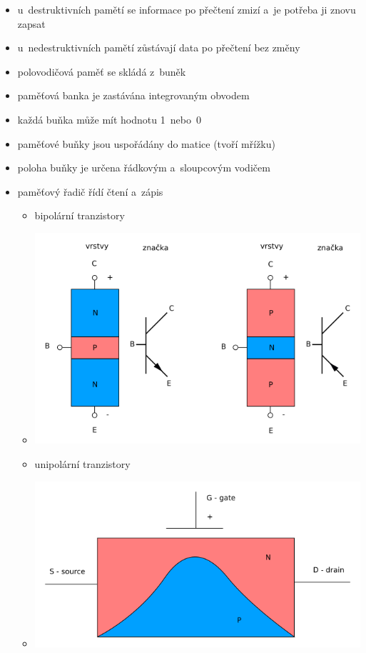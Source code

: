 \documentclass[a4paper,12pt]{article}
\providecommand{\tightlist}{%
\setlength{\itemsep}{0pt}\setlength{\parskip}{0pt}}
\begin{document}
\begin{itemize}
\tightlist
\item u~destruktivních pamětí se informace po přečtení zmizí a~je potřeba ji
  znovu zapsat
\item u~nedestruktivních pamětí zůstávají data po přečtení bez změny
\item polovodičová paměť se skládá z~buněk
\item paměťová banka je zastávána integrovaným obvodem
\item každá buňka může mít hodnotu 1~nebo~0
\item paměťové buňky jsou uspořádány do matice (tvoří mřížku)
\item poloha buňky je určena řádkovým a~sloupcovým vodičem
\item paměťový řadič řídí čtení a~zápis

  \begin{itemize}
  \tightlist
  \item bipolární tranzistory
  \item[] \includegraphics[width=15.529cm]{ref/bipolarni-transistory.png}
  \item unipolární tranzistory
  \item[] \includegraphics[width=15.73cm]{ref/unipolarni-tranzistor.png}
  \end{itemize}
\end{itemize}
\end{document}
